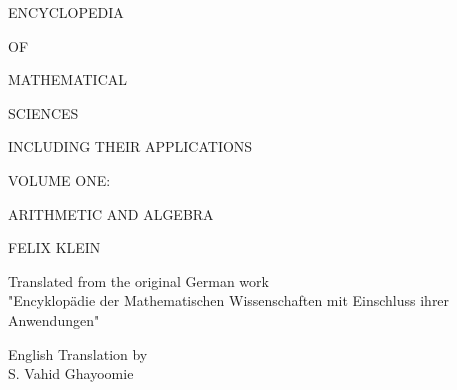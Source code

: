 \documentclass{book}
\begin{document}
\begin{center}
\vspace*{1cm}
{\fontsize{36}{42}\selectfont ENCYCLOPEDIA}

\vspace{0.5cm}
{\fontsize{24}{30}\selectfont OF}

\vspace{0.5cm}
{\fontsize{36}{42}\selectfont MATHEMATICAL}

\vspace{0.5cm}
{\fontsize{36}{42}\selectfont SCIENCES}

\vspace{1cm}
{\fontsize{18}{22}\selectfont INCLUDING THEIR APPLICATIONS}

\vspace{2cm}
{\fontsize{20}{26}\selectfont VOLUME ONE:}

\vspace{0.5cm}
{\fontsize{24}{30}\selectfont ARITHMETIC AND ALGEBRA}

\vspace{1.5cm}
{\fontsize{18}{22}\selectfont FELIX KLEIN}

\vspace{0.8cm}
{\fontsize{14}{16}\selectfont Translated from the original German work\\
"Encyklopädie der Mathematischen Wissenschaften mit Einschluss ihrer Anwendungen"}

\vspace{0.8cm}
{\fontsize{16}{20}\selectfont English Translation by\\[0.3cm]
S. Vahid Ghayoomie}

\end{center}

\tableofcontents

\cleardoublepage

\end{document}
